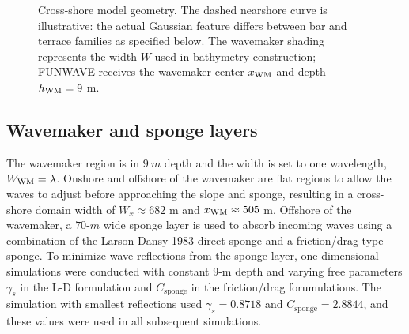 \documentclass[11pt]{article}
\begin{document}
\begin{figure}[htbp]
\centering
{}
\caption{Cross-shore model geometry.  The dashed nearshore curve is illustrative: the actual Gaussian feature differs between bar and terrace families as specified below.  The wavemaker shading represents the width $W$ used in bathymetry construction; FUNWAVE receives the wavemaker center $x_{\rm WM}$ and depth $h_{\rm WM}=9$ m.}
\label{fig:crossshore}
\end{figure}


\subsection{Wavemaker and sponge layers}

The wavemaker region is in $9~\unit{m}$ depth and the width is set to
one wavelength, $W_\mathrm{\rm WM}=\lambda$. Onshore and offshore of the wavemaker are
flat regions to allow the waves to adjust before approaching the slope
and sponge, resulting in a cross-shore domain width of $W_x\approx682$ m and
$x_{\rm WM}\approx505$ m.  Offshore of the wavemaker, a $70\mbox{-}\unit{m}$
wide sponge layer is used to absorb incoming waves using a combination
of the Larson-Dansy 1983 direct sponge and a friction/drag type
sponge. To minimize wave reflections from the sponge layer,
one dimensional simulations were conducted with constant 9-m depth and varying free
parameters $\gamma_s$ in the L-D formulation and $C_\mathrm{sponge}$ in the
friction/drag forumulations. The simulation with smallest reflections
used $\gamma_s=0.8718$ and $C_\mathrm{sponge}=2.8844$, and these
values were used in all subsequent simulations.
\end{document}
